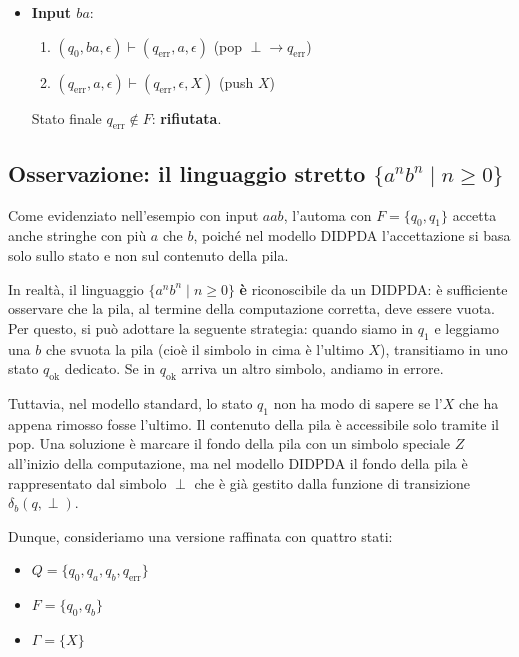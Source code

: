 \documentclass[a4paper,12pt]{article}
\begin{document}
\begin{itemize}
    \item \textbf{Input $ba$}:
    \begin{enumerate}
        \item $(q_0, ba, \epsilon) \vdash (q_{\text{err}}, a, \epsilon)$ \quad (pop $\perp \to q_{\text{err}}$)
        \item $(q_{\text{err}}, a, \epsilon) \vdash (q_{\text{err}}, \epsilon, X)$ \quad (push $X$)
    \end{enumerate}
    Stato finale $q_{\text{err}} \notin F$: \textbf{rifiutata}.
\end{itemize}

\subsection*{Osservazione: il linguaggio stretto $\{a^n b^n \mid n \geq 0\}$}

Come evidenziato nell'esempio con input $aab$, l'automa con $F = \{q_0, q_1\}$ accetta anche stringhe con più $a$ che $b$, poiché nel modello DIDPDA l'accettazione si basa solo sullo stato e non sul contenuto della pila.

In realtà, il linguaggio $\{a^n b^n \mid n \geq 0\}$ \textbf{è} riconoscibile da un DIDPDA: è sufficiente osservare che la pila, al termine della computazione corretta, deve essere vuota. Per questo, si può adottare la seguente strategia: quando siamo in $q_1$ e leggiamo una $b$ che svuota la pila (cioè il simbolo in cima è l'ultimo $X$), transitiamo in uno stato $q_{\text{ok}}$ dedicato. Se in $q_{\text{ok}}$ arriva un altro simbolo, andiamo in errore.

Tuttavia, nel modello standard, lo stato $q_1$ non ha modo di sapere se l'$X$ che ha appena rimosso fosse l'ultimo. Il contenuto della pila è accessibile solo tramite il pop. Una soluzione è marcare il fondo della pila con un simbolo speciale $Z$ all'inizio della computazione, ma nel modello DIDPDA il fondo della pila è rappresentato dal simbolo $\perp$ che è già gestito dalla funzione di transizione $\delta_b(q, \perp)$.

Dunque, consideriamo una versione raffinata con quattro stati:

\begin{itemize}
    \item $Q = \{q_0, q_a, q_b, q_{\text{err}}\}$
    \item $F = \{q_0, q_b\}$
    \item $\Gamma = \{X\}$
\end{itemize}
\end{document}

